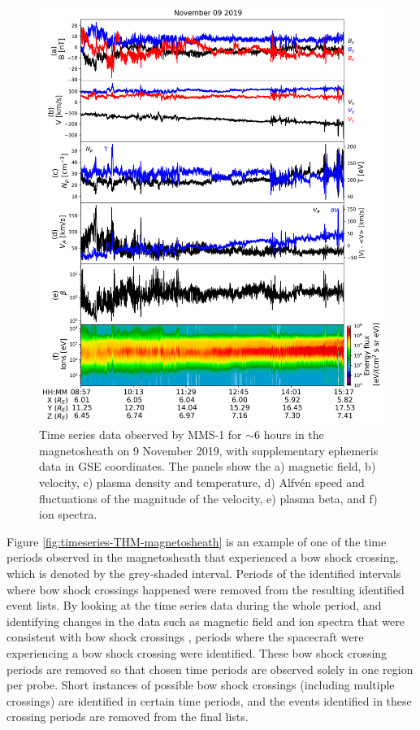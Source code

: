 \begin{figure}
    \centering
    \includegraphics[width=\textwidth]{Figures/Time series/timeseries_09112019_MMS1.png}
    \caption[Time series data for MMS-1 on 9 November 2019]{Time series data observed by MMS-1 for $\sim$6 hours in the magnetosheath on 9 November 2019, with supplementary ephemeris data in GSE coordinates. The panels show the a) magnetic field, b) velocity, c) plasma density and temperature, d) Alfv\'en speed and fluctuations of the magnitude of the velocity, e) plasma beta, and f) ion spectra.}
    \label{fig:timeseries-MMS-magnetosheath}
\end{figure}

Figure \ref{fig:timeseries-THM-magnetosheath} is an example of one of the time periods observed in the magnetosheath that experienced a bow shock crossing, which is denoted by the grey-shaded interval. Periods of the identified intervals where bow shock crossings happened were removed from the resulting identified event lists. By looking at the time series data during the whole period, and identifying changes in the data such as magnetic field and ion spectra that were consistent with bow shock crossings \cite{Lalti:2022,Trotta:2022}, periods where the spacecraft were experiencing a bow shock crossing were identified. These bow shock crossing periods are removed so that chosen time periods are observed solely in one region per probe. Short instances of possible bow shock crossings (including multiple crossings) are identified in certain time periods, and the events identified in these crossing periods are removed from the final lists.

